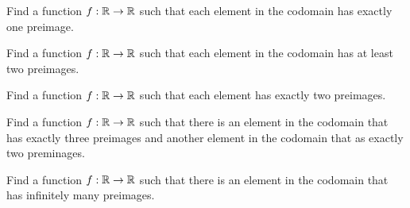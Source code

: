\be

\item 
	\ba
	\item Find a function $f: \mathbb{R} \to \mathbb{R}$ such that each element in the codomain has exactly one preimage. 

	\item Find a function $f: \mathbb{R} \to \mathbb{R}$ such that each element in the codomain has at least two preimages.
	
	\item Find a function $f: \mathbb{R} \to \mathbb{R}$ such that each element has exactly two preimages. 
	
	\item Find a function $f: \mathbb{R} \to \mathbb{R}$ such that there is an element in the codomain that has exactly three preimages and another element in the codomain that as exactly two preminages.

	
	\item Find a function $f: \mathbb{R} \to \mathbb{R}$ such that there is an element in the codomain that has infinitely many preimages. 	
	\ea


